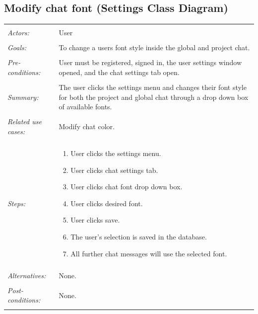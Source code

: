 \documentclass[11pt]{report}
\begin{document}
\subsection{Modify chat font (Settings Class Diagram)}
\begin{tabular}{ p{2cm} p{12cm} }
 \hline
 \\
 \textit{Actors:} & User \\ 
 \\
 \textit{Goals:} & To change a users font style inside the global and project chat. \\
 \\
 \textit{Pre-conditions:} & User must be registered, signed in, the user settings window opened, and the chat settings tab open.  \\
 \\
 \textit{Summary:} & The user clicks the settings menu and changes their font style for both the project and global chat through a drop down box of available fonts. \\ 
 \\
 \textit{Related use cases:} & Modify chat color. \\ 
 \\
 \textit{Steps:} & \begin{enumerate}
  \item User clicks the settings menu.
  \item User clicks chat settings tab.
  \item User clicks chat font drop down box.
  \item User clicks desired font.
  \item User clicks save.
  \item The user's selection is saved in the database.
  \item All further chat messages will use the selected font.
 \end{enumerate} \\
 \\
 \textit{Alternatives:} & None. \\
 \\
 \textit{Post-conditions:} & None. \\
 \\
\hline
\end{tabular}
\end{document}
